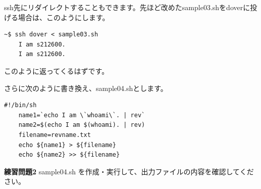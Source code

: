 \documentclass[a4j]{ltjreport}
\begin{document}
    ssh先にリダイレクトすることもできます。先ほど改めたsample03.shをdoverに投げる場合は、このようにします。
    \begin{lstlisting}[numbers=none]
    ~$ ssh dover < sample03.sh
    I am s212600.
    I am s212600.
    \end{lstlisting}
    このように返ってくるはずです。



    さらに次のように書き換え、sample04.shとします。
    \begin{lstlisting}[caption=sample04.sh]
    #!/bin/sh
    name1=`echo I am \`whoami\`. | rev`
    name2=$(echo I am $(whoami). | rev)
    filename=revname.txt
    echo ${name1} > ${filename}
    echo ${name2} >> ${filename}
    \end{lstlisting}



    \begin{itembox}[l]{\textbf{練習問題2}}
        sample04.sh を作成・実行して、出力ファイルの内容を確認してください。
    \end{itembox}

\end{document}
